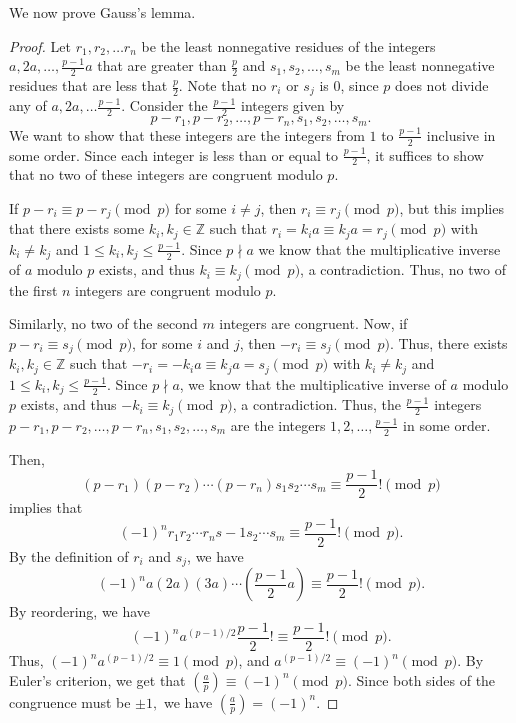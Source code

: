 \documentclass[letterpaper, 11 pt]{article}
\begin{document}
We now prove Gauss's lemma.
\begin{proof}
 Let $r_1,r_2,\dots r_n$ be the least nonnegative residues of the integers $a,2a,\dots,\frac{p-1}{2}a$ that are greater than $\frac{p}{2}$ and $s_1,s_2,\dots,s_m$ be the least nonnegative residues that are less that $\frac{p}{2}$. Note that no $r_i$ or $s_j$ is 0, since $p$ does not divide any of $a,2a,\dots \frac{p-1}{2}$. Consider the $\frac{p-1}{2}$ integers given by \[p-r_1,p-r_2,\dots,p-r_n,s_1,s_2,\dots,s_m.\]
 We want to show that these integers are the integers from $1$ to $\frac{p-1}{2}$ inclusive in some order. Since each integer is less than or equal to $\frac{p-1}{2}$, it suffices to show that no two of these integers are congruent modulo $p$. 
 
If $p-r_i\equiv p-r_j \pmod p$ for some $i\neq j$, then $r_i\equiv r_j \pmod p$, but this implies that there exists some $k_i,k_j\in\mathbb{Z}$ such that $r_i=k_ia\equiv k_ja=r_j\pmod p$ with $k_i\neq k_j$ and $1\leq k_i,k_j\leq {\frac{p-1}{2}}
$. Since $p\nmid a$
 we know that the multiplicative inverse of $a$ modulo $p$ exists, and thus $k_i\equiv k_j \pmod p$, a contradiction. Thus, no two of the first $n$ integers are congruent modulo $p$. 
 
 Similarly, no two of the second $m$ integers are congruent. Now, if $p-r_i\equiv s_j \pmod p$, for some $i$ and $j$, then $-r_i\equiv s_j \pmod p$. Thus, there exists $k_i,k_j\in\mathbb{Z}$ such that $-r_i=-k_ia\equiv k_ja=s_j\pmod p$ with $k_i\neq k_j$ and $1\leq k_i,k_j\leq\frac{p-1}{2}$. Since $p\nmid a$, we know that the multiplicative inverse of $a$ modulo $p$ exists, and thus $-k_i\equiv k_j \pmod p$, a contradiction.
Thus, the $\frac{p-1}{2}$ integers $p-r_1,p-r_2,\dots,p-r_n,s_1,s_2,\dots,s_m$ are the integers $1,2,\dots,\frac{p-1}{2}$ in some order. 

Then, \[(p-r_1)(p-r_2)\cdots(p-r_n)s_1s_2\cdots s_m\equiv\frac{p-1}{2}! \pmod p\]
implies that \[(-1)^nr_1r_2\cdots r_ns-1s_2\cdots s_m\equiv\frac{p-1}{2}! \pmod p.\]
By the definition of $r_i$ and $s_j$, we have 
\[(-1)^na(2a)(3a)\cdots(\frac{p-1}{2}a)\equiv\frac{p-1}{2}! \pmod p.\]
By reordering, we have 
\[(-1)^na^{(p-1)/2}\frac{p-1}{2}!\equiv\frac{p-1}{2}! \pmod p.\]
Thus, $(-1)^na^{(p-1)/2}\equiv 1 \pmod p$, and $a^{(p-1)/2}\equiv (-1)^n \pmod p$. By Euler's criterion, we get that $\left(\frac{a}{p}\right)\equiv(-1)^n \pmod p$. Since both sides of the congruence must be $\pm1,$ we have $\left(\frac{a}{p}\right)=(-1)^n $.
\end{proof}
\end{document}
